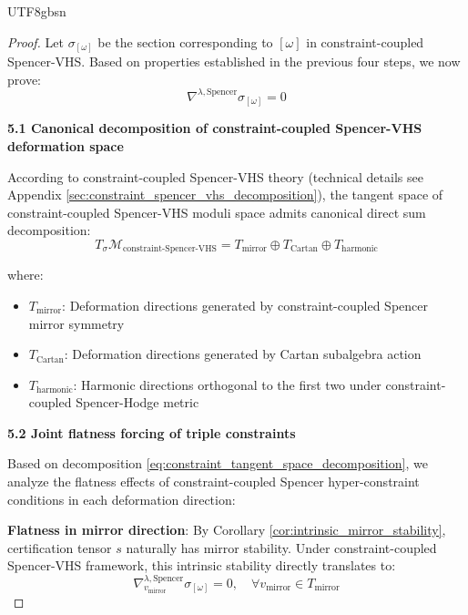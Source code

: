 \documentclass[a4paper,12pt]{extarticle}
\theoremstyle{definition}
\begin{document}
\begin{CJK}{UTF8}{gbsn}
\begin{proof}
Let $\sigma_{[\omega]}$ be the section corresponding to $[\omega]$ in constraint-coupled Spencer-VHS. Based on properties established in the previous four steps, we now prove:
\begin{equation}
\label{eq:constraint_spencer_flatness_forced}
\nabla^{\lambda,\text{Spencer}} \sigma_{[\omega]} = 0
\end{equation}

\textbf{5.1 Canonical decomposition of constraint-coupled Spencer-VHS deformation space}

According to constraint-coupled Spencer-VHS theory (technical details see Appendix \ref{sec:constraint_spencer_vhs_decomposition}), the tangent space of constraint-coupled Spencer-VHS moduli space admits canonical direct sum decomposition:
\begin{equation}
\label{eq:constraint_tangent_space_decomposition}
T_{\sigma} \mathcal{M}_{\text{constraint-Spencer-VHS}} = T_{\text{mirror}} \oplus T_{\text{Cartan}} \oplus T_{\text{harmonic}}
\end{equation}

where:
\begin{itemize}
    \item $T_{\text{mirror}}$: Deformation directions generated by constraint-coupled Spencer mirror symmetry
    \item $T_{\text{Cartan}}$: Deformation directions generated by Cartan subalgebra action
    \item $T_{\text{harmonic}}$: Harmonic directions orthogonal to the first two under constraint-coupled Spencer-Hodge metric
\end{itemize}

\textbf{5.2 Joint flatness forcing of triple constraints}

Based on decomposition \eqref{eq:constraint_tangent_space_decomposition}, we analyze the flatness effects of constraint-coupled Spencer hyper-constraint conditions in each deformation direction:

\textbf{Flatness in mirror direction}:
By Corollary \ref{cor:intrinsic_mirror_stability}, certification tensor $s$ naturally has mirror stability. Under constraint-coupled Spencer-VHS framework, this intrinsic stability directly translates to:
\begin{equation}
\label{eq:mirror_direction_flatness}
\nabla^{\lambda,\text{Spencer}}_{v_{\text{mirror}}} \sigma_{[\omega]} = 0, \quad \forall v_{\text{mirror}} \in T_{\text{mirror}}
\end{equation}


\end{proof}
\end{CJK}
\end{document}
